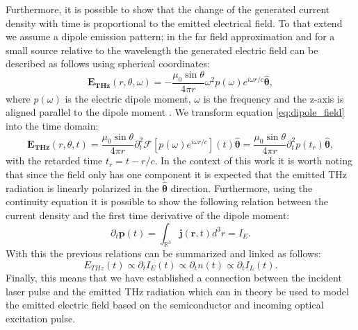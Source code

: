 Furthermore, it is possible to show that the change of the generated current density with time is proportional to the emitted electrical field. To that extend we assume a dipole emission pattern; in the far field approximation and for a small source relative to the wavelength the generated electric field can be described as follows using spherical coordinates:
\begin{equation}
    \label{eq:dipole_field}
    \bm{E_{THz}}(r, \theta, \omega) = -\frac{\mu_0 \sin \theta}{4\pi r} \omega^2 p(\omega) e^{i\omega r/c} \hat{\bm{\theta}},
\end{equation}
where $p(\omega)$ is the electric dipole moment, $\omega$ is the frequency and the z-axis is aligned parallel to the dipole moment \cite{Jackson1998}. We transform equation \ref{eq:dipole_field} into the time domain:
\begin{equation}
    \label{eq:dipole_field}
    \bm{E_{THz}}(r, \theta, t) = \frac{\mu_0 \sin \theta}{4\pi r} \partial_t^2 \mathcal{F}[p(\omega) e^{i\omega r/c}](t) \hat{\bm{\theta}} =
    \frac{\mu_0 \sin \theta}{4\pi r} \partial_t^2 p(t_r) \hat{\bm{\theta}},
\end{equation}
with the retarded time $t_r = t - r/c$. In the context of this work it is worth noting that since the field only has one component it is expected that the emitted THz radiation is linearly polarized in the $\hat{\bm{\theta}}$ direction. Furthermore, using the continuity equation it is possible to show \cite{Griffiths2017} the following relation between the current density and the first time derivative of the dipole moment:
\begin{equation}
    \partial_t \bm{p}(t) = \int_{\mathbb{R}^3} \bm{j}(\bm{r}, t) d^3r = I_E.
\end{equation}
With this the previous relations can be summarized and linked as follows:
\begin{equation}
    E_{THz}(t) \propto \partial_t I_E(t) \propto \partial_t n(t) \propto \partial_t I_L(t).
\end{equation}
Finally, this means that we have established a connection between the incident laser pulse and the emitted THz radiation which can in theory be used to model the emitted electric field based on the semiconductor and incoming optical excitation pulse.

